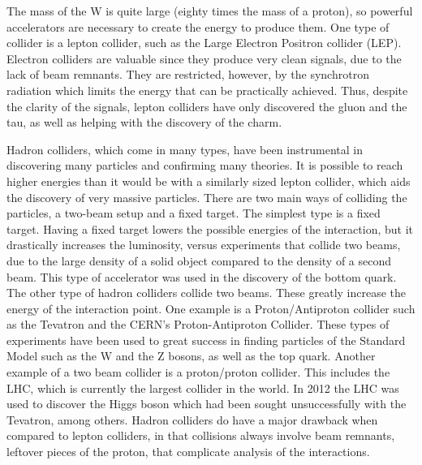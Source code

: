 The mass of the W is quite large (eighty times the mass of a proton), so powerful accelerators are necessary to create the energy to produce them. One type of collider is a lepton collider, such as the Large Electron Positron collider (LEP). Electron colliders are valuable since they produce very clean signals, due to the lack of beam remnants. They are restricted, however, by the synchrotron radiation which limits the energy that can be practically achieved. Thus, despite the clarity of the signals, lepton colliders have only discovered the gluon and the tau, as well as helping with the discovery of the charm\cite{TauHistory}\cite{GluonHist}. \par
	Hadron colliders, which come in many types, have been instrumental in discovering many particles and confirming many theories. It is possible to reach higher energies than it would be with a similarly sized lepton collider, which aids the discovery of very massive particles. There are two main ways of  colliding the particles, a two-beam setup and a fixed target. The simplest type is a fixed target. Having a fixed target lowers the possible energies of the interaction, but it drastically increases the luminosity, versus experiments that collide two beams, due to the large density of a solid object compared to the density of a second beam. This type of accelerator was used in the discovery of the bottom quark. The other type of hadron colliders collide two beams. These greatly increase the energy of the interaction point. One example is a Proton/Antiproton collider such as the Tevatron and the CERN's Proton-Antiproton Collider. These types of experiments have been used to great success in finding particles of the Standard Model such as the W and the Z bosons, as well as the top quark\cite{ZBosonDiscovery}\cite{Wdiscovery}\cite{WdiscoveryCont}\cite{TopDiscovery}. Another example of a two beam collider is a proton/proton collider. This includes the LHC, which is currently the largest collider in the world. In 2012 the LHC was used to discover the Higgs boson \cite{CMSHiggsPaper} which had been sought unsuccessfully with the Tevatron, among others. Hadron colliders do have a major drawback when compared to lepton colliders, in that collisions always involve beam remnants, leftover pieces of the proton, that complicate analysis of the interactions.\par
    
